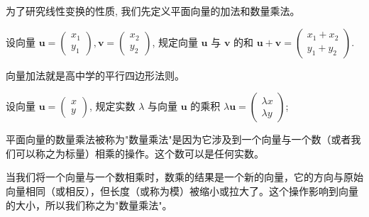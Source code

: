 \documentclass[lang=cn,newtx,10pt,scheme=chinese]{elegantbook}
\begin{document}
\vspace*{0.5cm}

为了研究线性变换的性质, 我们先定义平面向量的加法和数量乘法。

\begin{definition}[平面向量的加法]
  设向量 $\boldsymbol{u}=\left(\begin{array}{l}x_1 \\ y_1\end{array}\right), \boldsymbol{v}=\left(\begin{array}{l}x_2 \\ y_2\end{array}\right)$, 
  规定向量 $\boldsymbol{u}$ 与 $\boldsymbol{v}$ 的和 $\boldsymbol{u}+\boldsymbol{v}=\left(\begin{array}{l}x_1+x_2 \\ y_1+y_2\end{array}\right)$.
\end{definition}

\begin{note}
向量加法就是高中学的平行四边形法则。
\end{note}

\begin{definition}[平面向量的数量乘法]
  设向量 $\boldsymbol{u}=\left(\begin{array}{l}x \\ y\end{array}\right)$, 
  规定实数 $\lambda$ 与向量 $\boldsymbol{u}$ 的乘积 $\lambda \boldsymbol{u}=\left(\begin{array}{l}\lambda x \\ \lambda y\end{array}\right)$; 
\end{definition}

平面向量的数量乘法被称为"数量乘法"是因为它涉及到一个向量与一个数（或者我们可以称之为标量）相乘的操作。这个数可以是任何实数。

当我们将一个向量与一个数相乘时，数乘的结果是一个新的向量，它的方向与原始向量相同（或相反），但长度（或称为模）被缩小或拉大了。这个操作影响到向量的大小，所以我们称之为"数量乘法"。
\end{document}
